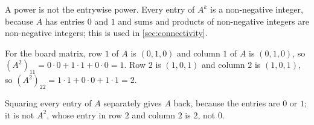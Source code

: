 \begin{remark}\label{rem:nonneg}
A power is not the entrywise power. Every entry of $A^k$ is a non-negative
integer, because $A$ has entries $0$ and $1$ and sums and products of
non-negative integers are non-negative integers; this is used in
\cref{sec:connectivity}.
\end{remark}
\begin{example}
For the board matrix, row $1$ of $A$ is $(0,1,0)$ and column $1$ of $A$ is
$(0,1,0)$, so $(A^2)_{11}=0\cdot 0+1\cdot 1+0\cdot 0=1$. Row $2$ is
$(1,0,1)$ and column $2$ is $(1,0,1)$, so
$(A^2)_{22}=1\cdot 1+0\cdot 0+1\cdot 1=2$.
\end{example}
\begin{nonexample}
Squaring every entry of $A$ separately gives $A$ back, because the entries
are $0$ or $1$; it is not $A^2$, whose entry in row $2$ and column $2$ is
$2$, not $0$.
\end{nonexample}
